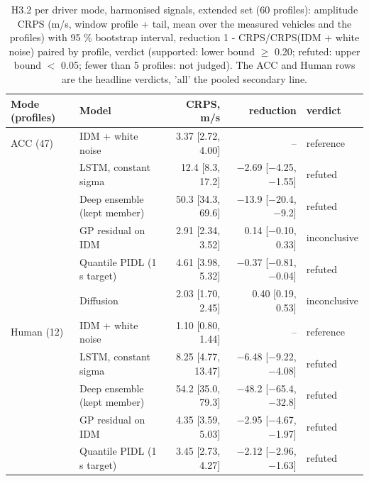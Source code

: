 \begin{table}[htbp]
\centering
\small
\caption{H3.2 per driver mode, harmonised signals, extended set (60 profiles): amplitude CRPS (m/s, window profile + tail, mean over the measured vehicles and the profiles) with 95 \% bootstrap interval, reduction 1 - CRPS/CRPS(IDM + white noise) paired by profile, verdict (supported: lower bound $\geq$ 0.20; refuted: upper bound $<$ 0.05; fewer than 5 profiles: not judged). The ACC and Human rows are the headline verdicts, 'all' the pooled secondary line.}
\label{tab:t5-h32--e3--harmonised}
\begin{tabular}{llrrl}
\toprule
Mode (profiles) & Model & CRPS, m/s & reduction & verdict \\
\midrule
ACC (47) & IDM + white noise & 3.37 [2.72, 4.00] & -- & reference \\
 & LSTM, constant sigma & 12.4 [8.3, 17.2] & $-$2.69 [$-$4.25, $-$1.55] & refuted \\
 & Deep ensemble (kept member) & 50.3 [34.3, 69.6] & $-$13.9 [$-$20.4, $-$9.2] & refuted \\
 & GP residual on IDM & 2.91 [2.34, 3.52] & 0.14 [$-$0.10, 0.33] & inconclusive \\
 & Quantile PIDL (1 s target) & 4.61 [3.98, 5.32] & $-$0.37 [$-$0.81, $-$0.04] & refuted \\
 & Diffusion & 2.03 [1.70, 2.45] & 0.40 [0.19, 0.53] & inconclusive \\
\midrule
Human (12) & IDM + white noise & 1.10 [0.80, 1.44] & -- & reference \\
 & LSTM, constant sigma & 8.25 [4.77, 13.47] & $-$6.48 [$-$9.22, $-$4.08] & refuted \\
 & Deep ensemble (kept member) & 54.2 [35.0, 79.3] & $-$48.2 [$-$65.4, $-$32.8] & refuted \\
 & GP residual on IDM & 4.35 [3.59, 5.03] & $-$2.95 [$-$4.67, $-$1.97] & refuted \\
 & Quantile PIDL (1 s target) & 3.45 [2.73, 4.27] & $-$2.12 [$-$2.96, $-$1.63] & refuted \\

\end{tabular}
\end{table}
